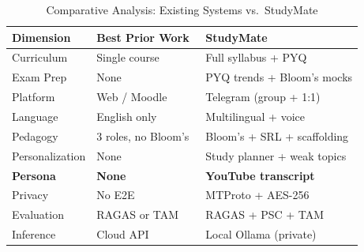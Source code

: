 \documentclass[conference]{IEEEtran}
\begin{document}
\begin{table}[htbp]
\caption{Comparative Analysis: Existing Systems vs.\ StudyMate}
\label{tab:comparison}
\begin{tabular}{p{1.6cm} p{2.0cm} p{2.9cm}}
\toprule
\textbf{Dimension} & \textbf{Best Prior Work} & \textbf{StudyMate} \\
\midrule
Curriculum      & Single course~\cite{neumann2025}      & Full syllabus + PYQ \\
Exam Prep       & None                                  & PYQ trends + Bloom's mocks \\
Platform        & Web / Moodle                          & Telegram (group + 1:1) \\
Language        & English only                          & Multilingual + voice \\
Pedagogy        & 3 roles, no Bloom's~\cite{lauber2025} & Bloom's + SRL + scaffolding \\
Personalization & None                                  & Study planner + weak topics \\
\textbf{Persona}& \textbf{None}                         & \textbf{YouTube transcript} \\
Privacy         & No E2E                                & MTProto + AES-256 \\
Evaluation      & RAGAS or TAM                          & RAGAS + PSC + TAM \\
Inference       & Cloud API                             & Local Ollama (private) \\
\bottomrule
\end{tabular}
\end{table}
\end{document}
